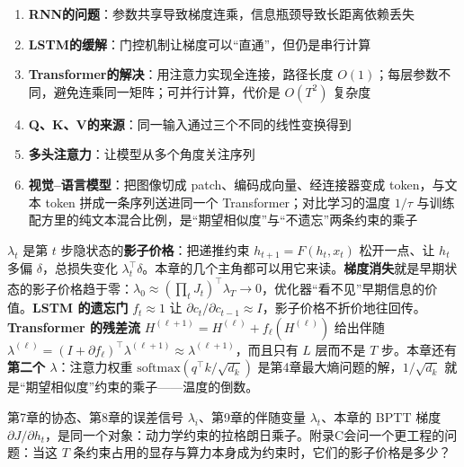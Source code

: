 \begin{enumerate}
    \item \textbf{RNN的问题}：参数共享导致梯度连乘，信息瓶颈导致长距离依赖丢失
    
    \item \textbf{LSTM的缓解}：门控机制让梯度可以“直通”，但仍是串行计算
    
    \item \textbf{Transformer的解决}：用注意力实现全连接，路径长度 $O(1)$；每层参数不同，避免连乘同一矩阵；可并行计算，代价是 $O(T^2)$ 复杂度
    
    \item \textbf{Q、K、V的来源}：同一输入通过三个不同的线性变换得到
    
    \item \textbf{多头注意力}：让模型从多个角度关注序列
    
    \item \textbf{视觉--语言模型}：把图像切成 patch、编码成向量、经连接器变成 token，与文本 token 拼成一条序列送进同一个 Transformer；对比学习的温度 $1/\tau$ 与训练配方里的纯文本混合比例，是“期望相似度”与“不遗忘”两条约束的乘子
\end{enumerate}

\begin{physicalmeaning}[title=$\lambda_t$ 在本章的意义]
$\lambda_t$ 是第 $t$ 步隐状态的\textbf{影子价格}：把递推约束 $h_{t+1} = F(h_t, x_t)$ 松开一点、让 $h_t$ 多偏 $\delta$，总损失变化 $\lambda_t^\top \delta$。本章的几个主角都可以用它来读。\textbf{梯度消失}就是早期状态的影子价格趋于零：$\lambda_0 \approx (\prod_t J_t)^\top \lambda_T \to 0$，优化器“看不见”早期信息的价值。\textbf{LSTM 的遗忘门} $f_t \approx 1$ 让 $\partial c_t/\partial c_{t-1} \approx I$，影子价格不折价地往回传。\textbf{Transformer 的残差流} $H^{(\ell+1)} = H^{(\ell)} + f_\ell(H^{(\ell)})$ 给出伴随 $\lambda^{(\ell)} = (I + \partial f_\ell)^\top \lambda^{(\ell+1)} \approx \lambda^{(\ell+1)}$，而且只有 $L$ 层而不是 $T$ 步。本章还有\textbf{第二个 $\lambda$}：注意力权重 $\mathrm{softmax}(q^\top k/\sqrt{d_k})$ 是第4章最大熵问题的解，$1/\sqrt{d_k}$ 就是“期望相似度”约束的乘子——温度的倒数。
\end{physicalmeaning}

\begin{unification}[title=统一视角]
第7章的协态、第8章的误差信号 $\lambda_i$、第9章的伴随变量 $\lambda_t$、本章的 BPTT 梯度 $\partial J/\partial h_t$，是同一个对象：动力学约束的拉格朗日乘子。附录C会问一个更工程的问题：当这 $T$ 条约束占用的显存与算力本身成为约束时，它们的影子价格是多少？
\end{unification}


